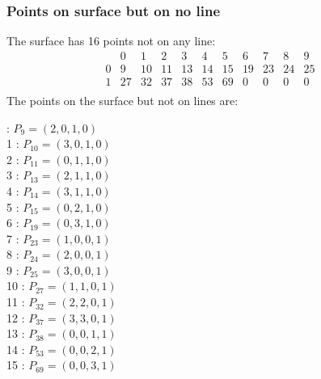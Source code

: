 \documentclass{article}
\begin{document}
{\subsubsection*{Points on surface but on no line}
The surface has 16 points not on any line:\\
$$
\begin{array}{r|*{10}{r}}
 & 0 & 1 & 2 & 3 & 4 & 5 & 6 & 7 & 8 & 9\\
\hline
0 & 9 & 10 & 11 & 13 & 14 & 15 & 19 & 23 & 24 & 25\\
1 & 27 & 32 & 37 & 38 & 53 & 69 & 0 & 0 & 0 & 0\\
\end{array}
$$
The points on the surface but not on lines are:\\
\begin{multicols}{2}
 : $P_{9}=( 2, 0, 1, 0 )$\\
1 : $P_{10}=( 3, 0, 1, 0 )$\\
2 : $P_{11}=( 0, 1, 1, 0 )$\\
3 : $P_{13}=( 2, 1, 1, 0 )$\\
4 : $P_{14}=( 3, 1, 1, 0 )$\\
5 : $P_{15}=( 0, 2, 1, 0 )$\\
6 : $P_{19}=( 0, 3, 1, 0 )$\\
7 : $P_{23}=( 1, 0, 0, 1 )$\\
8 : $P_{24}=( 2, 0, 0, 1 )$\\
9 : $P_{25}=( 3, 0, 0, 1 )$\\
10 : $P_{27}=( 1, 1, 0, 1 )$\\
11 : $P_{32}=( 2, 2, 0, 1 )$\\
12 : $P_{37}=( 3, 3, 0, 1 )$\\
13 : $P_{38}=( 0, 0, 1, 1 )$\\
14 : $P_{53}=( 0, 0, 2, 1 )$\\
15 : $P_{69}=( 0, 0, 3, 1 )$\\
\end{multicols}
}
\end{document}
